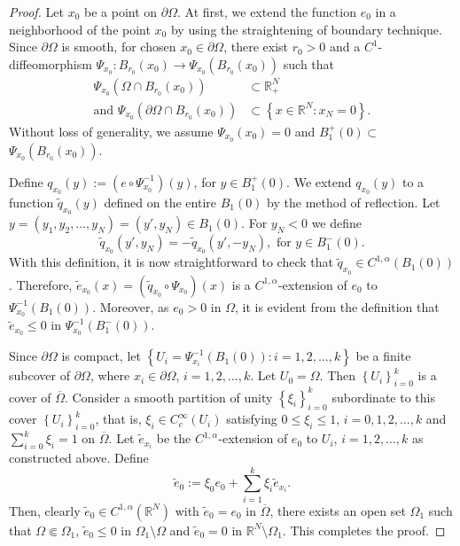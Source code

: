 \documentclass[reqno,oneside]{amsart}
\theoremstyle{definition}
\theoremstyle{remark}
\numberwithin{equation}{section}
\newcommand{\Om} {\Omega}
\newcommand{\pa}{\partial}
\newcommand{\sr}{\mathbb{R}}
\newcommand{\rar}{\rightarrow}
\begin{document}
\begin{proof}
    Let $x_0$ be a point on $\pa\Om$. At first, we extend the function $e_0$ in a neighborhood of the point $x_0$ by using the straightening of boundary technique. Since $\pa\Om$ is smooth, for chosen $x_0 \in \pa\Om$, there exist $r_0 >0$ and a $C^1$-diffeomorphism $\Psi_{x_0} : B_{r_0} (x_0) \rar \Psi_{x_0} \left(B_{r_0} (x_0) \right)$ such that
    \begin{equation*}
        \begin{aligned}
            \Psi_{x_0} \left(\Om \cap B_{r_0} (x_0) \right) &\subset \sr_+^N\\
            \text{and } \Psi_{x_0} \left(\pa \Om \cap B_{r_0} (x_0) \right) &\subset \left\{x\in \sr^N : x_N =0 \right\}.
        \end{aligned}
    \end{equation*}
    Without loss of generality, we assume $\Psi_{x_0} (x_0) =0$ and $B_1^+ (0) \subset$ $\Psi_{x_0} \left(B_{r_0} (x_0) \right)$.

    Define $q_{x_0} (y):= \left(e \circ \Psi_{x_0}^{-1}\right) \left(y\right)$, for $y \in B_1^+ (0)$. We extend $q_{x_0} (y)$ to a function $\tilde{q}_{x_0} (y)$ defined on the entire $B_1 (0)$ by the method of reflection. Let $y=(y_1, y_2, \dots, y_N)= (y', y_N) \in B_1 (0)$. For $y_N<0$ we define
    \[\tilde{q}_{x_0} (y', y_N) = - \tilde{q}_{x_0} (y', -y_N), \text{ for } y\in B_1^- (0).\]
    With this definition, it is now straightforward to check that $\tilde{q}_{x_0}$$\in C^{1,\alpha} (B_1 (0))$. Therefore, $\tilde{e}_{x_0} (x)= \left(\tilde{q}_{x_0} \circ \Psi_{x_0}\right) \left(x\right)$ is a $C^{1,\alpha}$-extension of $e_0$ to $\Psi_{x_0}^{-1} \left(B_1 (0)\right)$. Moreover, as $e_0 > 0$ in $\Om$, it is evident from the definition that $\tilde{e}_{x_0} \leq 0$ in $\Psi_{x_0}^{-1} \left(B_1^- (0)\right)$.

    Since $\pa\Om$ is compact, let $\left\{ U_i = \Psi_{x_i}^{-1} \left(B_1 (0)\right) : i=1,2, \dots, k \right\}$ be a finite subcover of $\pa\Om$, where $x_i \in \pa\Om$, $i=1,2, \dots, k$. Let $U_0 = \Om$. Then $\left\{ U_i \right\}_{i=0}^k$ is a cover of $\overline{\Om}$. Consider a smooth partition of unity $\left\{\xi_i\right\}_{i=0}^k$ subordinate to this cover $\left\{U_i\right\}_{i=0}^k$, that is, $\xi_i \in C_c^{\infty}(U_i)$ satisfying $0\leq \xi_i \leq 1$, $i= 0, 1, 2, \dots, k$ and $\sum_{i=0}^k \xi_i = 1$ on $\overline{\Om}$. Let $\tilde{e}_{x_i}$ be the $C^{1,\alpha}$-extension of $e_0$ to $U_i$, $i=1,2, \dots,k$ as constructed above. Define
    \[\tilde{e}_0 := \xi_0 e_0 + \sum_{i=1}^k \xi_i \tilde{e}_{x_i}. \]
    Then, clearly $\tilde{e}_0\in C^{1,\alpha} (\sr^N)$ with $\tilde{e}_0 = e_0$ in $\overline{\Om}$, there exists an open set $\Om_1$ such that $\Om \Subset \Om_1$, $\tilde{e}_0 \leq 0$ in $\Om_1 \setminus \Om$ and $\tilde{e}_0 = 0$ in $\sr^N \setminus \Om_1$. This completes the proof.    
\end{proof}
\end{document}
